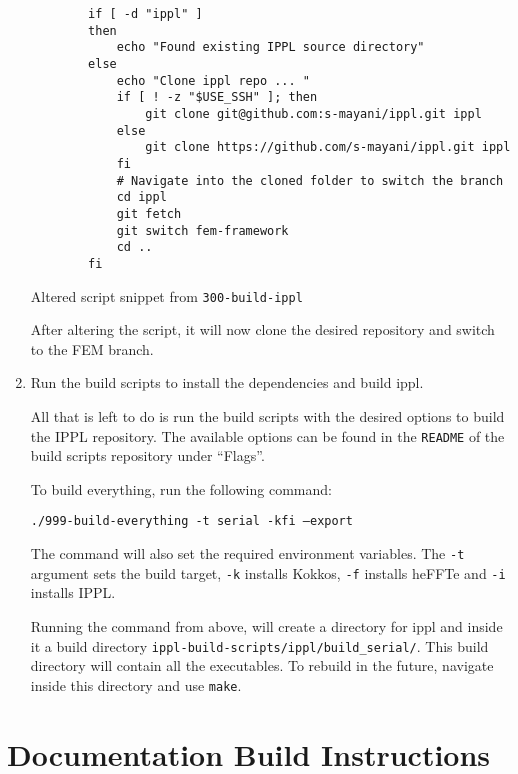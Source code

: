 \begin{enumerate}
          \begin{Code}
              \begin{verbatim}
        if [ -d "ippl" ] 
        then
            echo "Found existing IPPL source directory"
        else
            echo "Clone ippl repo ... "
            if [ ! -z "$USE_SSH" ]; then
                git clone git@github.com:s-mayani/ippl.git ippl
            else
                git clone https://github.com/s-mayani/ippl.git ippl
            fi
            # Navigate into the cloned folder to switch the branch
            cd ippl
            git fetch
            git switch fem-framework
            cd ..
        fi
          \end{verbatim}
              \caption{Altered script snippet from \texttt{300-build-ippl}}
              \label{code:script-ippl-2}
          \end{Code}

          After altering the script, it will now clone the desired repository and switch to the FEM branch.

    \item Run the build scripts to install the dependencies and build ippl.

          All that is left to do is run the build scripts with the desired options to build the IPPL repository.
          The available options can be found in the \texttt{README} of the build scripts repository under ``Flags''.

          To build everything, run the following command:

          \texttt{./999-build-everything -t serial -kfi --export}

          The command will also set the required environment variables.
          The \texttt{-t} argument sets the build target, \texttt{-k} installs Kokkos,
          \texttt{-f} installs heFFTe and \texttt{-i} installs IPPL.

          Running the command from above, will create a directory for ippl and inside it
          a build directory \texttt{ippl-build-scripts/ippl/build\_serial/}.
          This build directory will contain all the executables.
          To rebuild in the future, navigate inside this directory and use \texttt{make}.

\end{enumerate}

\section{Documentation Build Instructions}
\label{app:doxygen}

